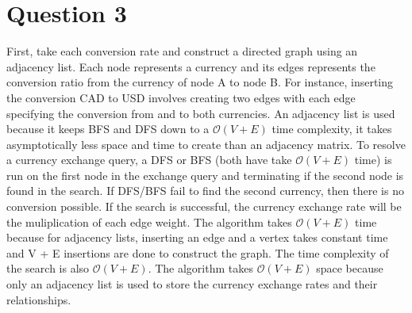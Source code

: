 
\section{Question 3}
First, take each conversion rate and construct a directed graph using an adjacency list.
Each node represents a currency and its edges represents the conversion ratio from the currency of node A to node B.
For instance, inserting the conversion CAD to USD involves creating two edges with each edge specifying the conversion from and to both currencies.
An adjacency list is used because it keeps BFS and DFS down to a $\mathcal{O}(V + E)$ time complexity, 
it takes asymptotically less space and time to create than an adjacency matrix.
\linebreak
To resolve a currency exchange query, a DFS or BFS (both have take $\mathcal{O}(V + E)$ time) is run on the first node in the exchange query and
terminating if the second node is found in the search. If DFS/BFS fail to find the second currency, then there is no conversion possible.
If the search is successful, the currency exchange rate will be the muliplication of each edge weight.
\linebreak
The algorithm takes $\mathcal{O}(V + E)$ time because for adjacency lists, inserting an edge and a vertex takes constant time and V + E insertions
are done to construct the graph. The time complexity of the search is also $\mathcal{O}(V + E)$.
The algorithm takes $\mathcal{O}(V + E)$ space because only an adjacency list is used to store the currency exchange rates and their relationships.

